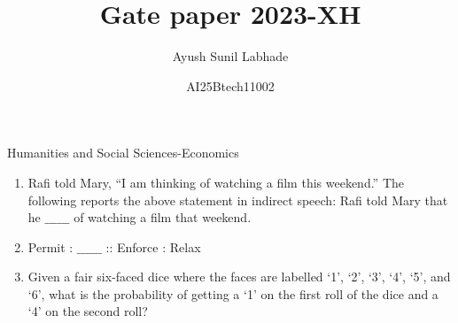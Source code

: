 \documentclass[12pt]{article}
\theoremstyle{remark}
\begin{document}
\title{\vspace{-5cm}Gate paper 2023-XH}
\author{Ayush Sunil Labhade}
\date{AI25Btech11002}
\maketitle
\begin{flushright}Humanities and Social Sciences-Economics\end{flushright}
\begin{enumerate}
\item Rafi told Mary, “I am thinking of watching a film this weekend.”
The following reports the above statement in indirect speech:
Rafi told Mary that he $\_\_\_\_\_\_$ of watching a film that weekend. 
\begin{enumerate}  \end{enumerate}
\hfill{}
\item Permit : $\_\_\_\_\_\_$ :: Enforce : Relax
\newline
\begin{enumerate}  \end{enumerate}
\hfill{}
\item Given a fair six-faced dice where the faces are labelled ‘1’, ‘2’, ‘3’, ‘4’, ‘5’, and ‘6’, what is the probability of getting a ‘1’ on the first roll of the dice and a ‘4’ on the second roll?
\begin{enumerate} 
\end{enumerate}
\end{enumerate}
\end{document}
